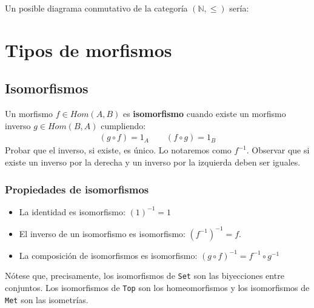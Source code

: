 \documentclass[a4paper, 11pt]{amsart}
\theoremstyle{definition}
\theoremstyle{remark}
\numberwithin{equation}{section}
\begin{document}
      Un posible diagrama conmutativo de la categoría \texttt{$(\mathbb{N},\leq)$} sería:
      \begin{center}
      \end{center}
    
\newpage
\section {Tipos de morfismos}
  \subsection {Isomorfismos}
     Un morfismo $f \in Hom(A,B)$ es \textbf{isomorfismo} cuando existe un morfismo inverso
    $g \in Hom(B,A)$ cumpliendo:
    \begin{gather*}
     (g \circ f) = 1_A \qquad (f \circ g) = 1_B
    \end{gather*}
    \exca Probar que el inverso, si existe, es único. Lo notaremos como $f^{-1}$. Observar que si
    existe un inverso por la derecha y un inverso por la izquierda deben ser iguales.
    
    \subsubsection{Propiedades de isomorfismos}
      \begin{itemize}
       \item La identidad es isomorfismo: $(1)^{-1} = 1$ 
       \item El inverso de un isomorfismo es isomorfismo: $(f^{-1})^{-1} = f$.
       \item La composición de isomorfismos es isomorfismo: $(g \circ f)^{-1} = f^{-1} \circ g^{-1}$
      \end{itemize}

    Nótese que, precisamente, los isomorfismos de \texttt{Set} son las biyecciones entre conjuntos.
    Los isomorfismos de \texttt{Top} son los homeomorfismos y los isomorfismos de \texttt{Met} son
    las isometrías.
    
\end{document}
